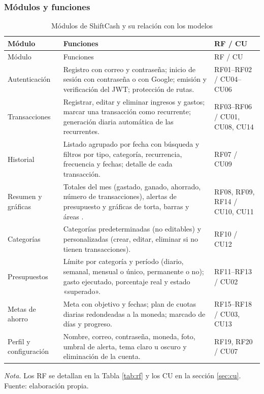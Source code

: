 \subsubsection{Módulos y funciones}

\begin{longtable}{L{2.6cm} L{7.2cm} L{2.4cm}}
\caption{Módulos de ShiftCash y su relación con los modelos}\label{tab:modulos}\\
\toprule
Módulo & Funciones & RF / CU \\
\midrule
\endfirsthead
\toprule
Módulo & Funciones & RF / CU \\
\midrule
\endhead
Autenticación & Registro con correo y contraseña; inicio de sesión con contraseña o con Google; emisión y verificación del JWT; protección de rutas. & RF01–RF02 / CU04–CU06 \\
Transacciones & Registrar, editar y eliminar ingresos y gastos; marcar una transacción como recurrente; generación diaria automática de las recurrentes. & RF03–RF06 / CU01, CU08, CU14 \\
Historial & Listado agrupado por fecha con búsqueda y filtros por tipo, categoría, recurrencia, frecuencia y fechas; detalle de cada transacción. & RF07 / CU09 \\
Resumen y gráficas & Totales del mes (gastado, ganado, ahorrado, número de transacciones), alertas de presupuesto y gráficas de torta, barras y áreas \parencite{recharts2025}. & RF08, RF09, RF14 / CU10, CU11 \\
Categorías & Categorías predeterminadas (no editables) y personalizadas (crear, editar, eliminar si no tienen transacciones). & RF10 / CU12 \\
Presupuestos & Límite por categoría y período (diario, semanal, mensual o único, permanente o no); gasto ejecutado, porcentaje real y estado «superado». & RF11–RF13 / CU02 \\
Metas de ahorro & Meta con objetivo y fechas; plan de cuotas diarias redondeadas a la moneda; marcado de días y progreso. & RF15–RF18 / CU03, CU13 \\
Perfil y configuración & Nombre, correo, contraseña, moneda, foto, umbral de alerta, tema claro u oscuro y eliminación de la cuenta. & RF19, RF20 / CU07 \\
\bottomrule
\end{longtable}
\vspace{-1em}
{\small\textit{Nota.} Los RF se detallan en la Tabla \ref{tab:rf} y los CU en la sección \ref{sec:cu}. Fuente: elaboración propia.}

